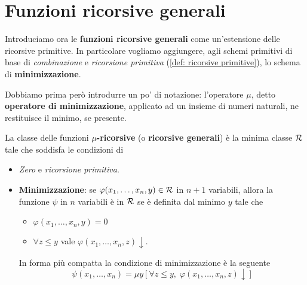 \section{Funzioni ricorsive generali}
Introduciamo ora le \textbf{funzioni ricorsive generali} come
un'estensione delle ricorsive primitive. In particolare vogliamo
aggiungere, agli schemi primitivi di base di \emph{combinazione}
e \emph{ricorsione primitiva} (\ref{def: ricorsive primitive}),
lo schema di \textbf{minimizzazione}.

Dobbiamo prima però introdurre un po' di notazione: l'operatore
$\mu$, detto \textbf{operatore di minimizzazione}, applicato
ad un insieme di numeri naturali, ne restituisce il minimo, se
presente.

\begin{definition} \label{def: mu ricorsive}
	La classe delle funzioni \textbf{$\mu$-ricorsive} (o
	\textbf{ricorsive generali}) è la minima classe
	$\mathcal{R}$ tale che soddisfa le condizioni di
	\begin{itemize}
		\item \emph{Zero} e \emph{ricorsione primitiva}.
		\item \textbf{Minimizzazione}: se
		      $\varphi (x_1, \dots, x_n, y) \in \mathcal{R}$ in $n+1$
		      variabili, allora la funzione $\psi$ in $n$
		      variabili è in $\mathcal{R}$ se è definita dal minimo $y$
		      tale che
		      \begin{itemize}
			      \item $\varphi(x_1, \dots, x_n, y) = 0$
			      \item $\forall z \leq y$ vale $\varphi(x_1,
				            \dots, x_n, z) \downarrow$.
		      \end{itemize}
		      In forma più compatta la condizione di
		      minimizzazione è la seguente
		      \[
			      \psi (x_1, \dots, x_n) = \mu y [
					      \forall z \leq y, \;
					      \varphi(x_1, \dots, x_n, z)
					      \downarrow]
		      \]
	\end{itemize}
\end{definition}

